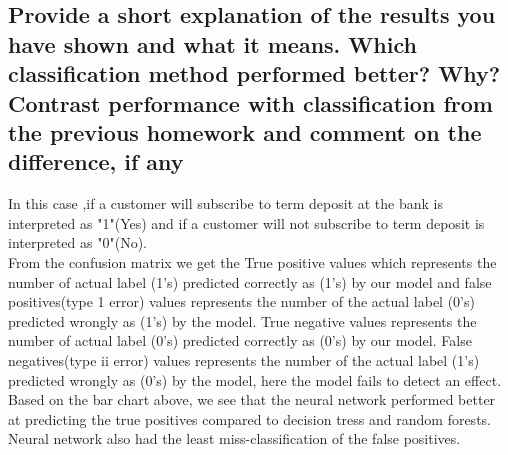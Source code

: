 \subsection{Provide a short explanation of the results you have shown and what it means. Which classification method performed better? Why? Contrast performance with classification from the previous homework and comment on the difference, if any}
In this case ,if a customer will subscribe to term deposit at the bank is interpreted as "1"(Yes) and if a customer will not subscribe to term deposit is interpreted as "0"(No).\\
From the confusion matrix we get the True positive values  which represents the number of actual label (1's) predicted correctly as (1's) by our model and false positives(type 1 error) values represents the number of the  actual label (0's) predicted wrongly as (1's) by the model. True negative values represents the number of actual label (0's) predicted correctly as (0's) by our model. False negatives(type ii error) values represents the number of the  actual label (1's) predicted wrongly as (0's) by the model, here the model fails to detect an effect. Based on the bar chart above, we see that the neural network performed better at predicting the true positives compared to decision tress and random forests. Neural network also had the least miss-classification of the false positives. 




